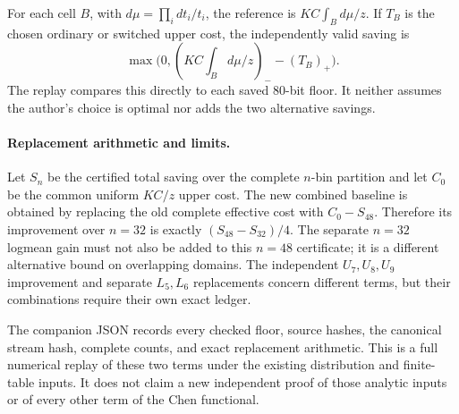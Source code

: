 For each cell $B$, with $d\mu=\prod_i dt_i/t_i$, the reference is
$KC\int_Bd\mu/z$.  If $T_B$ is the chosen ordinary or switched upper
cost, the independently valid saving is
\[
 \max\bigl(0,(KC\int_Bd\mu/z)_--(T_B)_+\bigr).
\]
The replay compares this directly to each saved 80-bit floor.  It
neither assumes the author's choice is optimal nor adds the two
alternative savings.

\paragraph{Replacement arithmetic and limits.}
Let $S_n$ be the certified total saving over the complete $n$-bin
partition and let $C_0$ be the common uniform $KC/z$ upper cost.
The new combined baseline is obtained by replacing the old complete
effective cost with $C_0-S_{48}$.  Therefore its improvement over
$n=32$ is exactly $(S_{48}-S_{32})/4$.  The separate $n=32$
logmean gain must not also be added to this $n=48$ certificate; it is
a different alternative bound on overlapping domains.  The independent
$U_7,U_8,U_9$ improvement and separate $L_5,L_6$ replacements concern
different terms, but their combinations require their own exact ledger.

The companion JSON records every checked floor, source hashes,
the canonical stream hash, complete counts, and exact replacement
arithmetic.  This is a full numerical replay of these two terms under
the existing distribution and finite-table inputs.  It does not claim
a new independent proof of those analytic inputs or of every other
term of the Chen functional.
